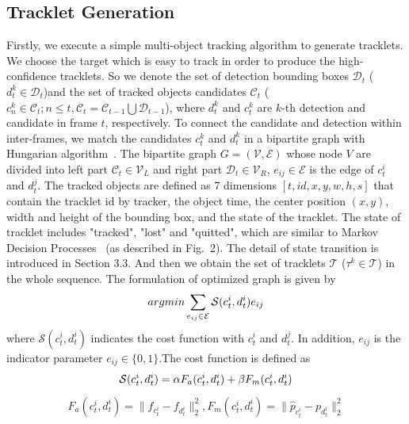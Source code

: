 \documentclass[5pt]{article}
\begin{document}
\subsection{Tracklet Generation}
\vspace{-0.1cm}
Firstly, we execute a simple multi-object tracking algorithm to generate tracklets. We choose the target which is easy to track in order to produce the high-confidence tracklets. So we denote the set of detection bounding boxes $\mathcal{D}_t$ ($d_t^k \in \mathcal{D}_t $)and the set of tracked objects candidates $\mathcal{C}_{t}$ ($c_n^k \in \mathcal{C}_{t} ; n \leq t,\mathcal{C}_{t}=\mathcal{C}_{t-1}\bigcup\mathcal{D}_{t-1}$), where $d_t^k$ and $c_t^k$ are $k$-th detection and candidate in frame $t$, respectively. To connect the candidate and detection within inter-frames, we match the candidates ${c_t^k}$ and ${d_t^k}$ in a bipartite graph with Hungarian algorithm~\cite{Sahbani2017Kalman}. The bipartite graph $G=(\mathcal{V},\mathcal{E})$ whose node $V$ are divided into left part $\mathcal{C}_t\in\mathcal{V}_L$ and right part $\mathcal{D}_t\in\mathcal{V}_R$, $e_{ij}\in\mathcal{E}$ is the edge of $c_t^i$ and $d_t^j$. The tracked objects are defined as 7 dimensions $[t, id, x, y, w, h, s]$ that contain the tracklet id by tracker, the object time, the center position $(x,y)$, width and height of the bounding box, and the state of the tracklet. The state of tracklet includes "tracked", "lost" and "quitted", which are similar to Markov Decision Processes~\cite{xiang2015learning} (as described in Fig.\ 2). The detail of state transition is introduced in Section 3.3. And then we obtain the set of tracklets $\mathcal{T}$ ($\tau^k \in \mathcal{T} $) in the whole sequence. The formulation of optimized graph is given by
\begin{eqnarray}
argmin\sum_{e_{ij}\in\mathcal{E}}\mathcal{S}(c_t^i,d_t^i)e_{ij}
\vspace{-0.2cm}
\end{eqnarray}
where $\mathcal{S}(c_t^i,d_t^i)$ indicates the cost function with $c_t^i$ and $d_t^j$. In addition, $e_{ij}$ is the indicator parameter $e_{ij}\in \{0,1\}$.The cost function is defined as
\begin{eqnarray}
\mathcal{S}(c_t^i,d_t^i)=\alpha F_a(c_t^i,d_t^i)+\beta F_m(c_t^i,d_t^i)
\vspace{-0.6cm}
\end{eqnarray}
\begin{eqnarray}
F_a(c_t^i,d_t^i)=\parallel f_{c_t^i}-f_{d_t^i}\parallel_2^2,  F_m(c_t^i,d_t^i)=\parallel \hat{p}_{c_t^i}-p_{d_t^i}\parallel_2^2
\end{eqnarray}
\end{document}
